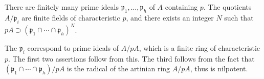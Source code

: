 There are finitely many prime ideals $\mathfrak{p}_1, \ldots, \mathfrak{p}_h$ of $A$ containing $p$. The quotients $A/\mathfrak{p}_i$ are finite fields of characteristic $p$, and there exists an integer $N$ such that $pA \supset (\mathfrak{p}_1 \cap \cdots \cap \mathfrak{p}_h)^N$.

The $\mathfrak{p}_i$ correspond to prime ideals of $A/pA$, which is a finite ring of characteristic $p$. The first two assertions follow from this. The third follows from the fact that $(\mathfrak{p}_1 \cap \cdots \cap \mathfrak{p}_h)/pA$ is the radical of the artinian ring $A/pA$, thus is nilpotent.
